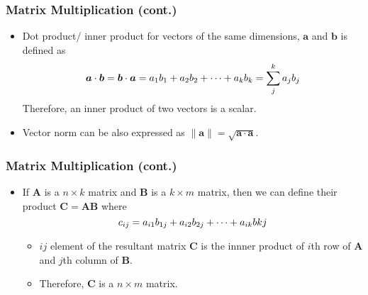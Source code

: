 \documentclass[pdflatex, 12pt]{beamer}
\begin{document}
\begin{frame}
\frametitle{Matrix Multiplication (cont.)}
\begin{itemize}
\item {\color{red} Dot product}/{\color{red} inner product} for vectors of the same dimensions, $\bm{a}$ and $\bm{b}$ is defined as 
\begin{equation}
 \bm{a} \cdot \bm{b} = \bm{b} \cdot \bm{a} = a_{1}b_{1} + a_{2}b_{2} + \cdots + a_{k}b_{k} = \sum_j^k a_{j}b_{j} \notag 
 \end{equation}
Therefore, an inner product of two vectors is a scalar.
\vspace{0.4cm}
\item Vector norm can be also expressed as $\|\bm{a}\| = \sqrt{\bm{a} \cdot \bm{a}}$.  
\end{itemize}
\end{frame}

\begin{frame}
\frametitle{Matrix Multiplication (cont.)}
\begin{itemize}
\item If $\bm{A}$ is a $n \times k$ matrix and $\bm{B}$ is a $k \times m$ matrix, then we can define their product $\bm{C} = \bm{AB}$ where
 \begin{equation}
 c_{ij} = a_{i1}b_{1j} + a_{i2}b_{2j} + \cdots + a_{ik}b{kj} \notag
 \end{equation}
 \begin{itemize}
 \item $ij$ element of the resultant matrix $\bm{C}$ is the innner product of $i$th row of $\bm{A}$ and $j$th column of $\bm{B}$.
 \item Therefore, $\bm{C}$ is a $n \times m$ matrix.
 \end{itemize}
\end{itemize}
\end{frame}
\end{document}
